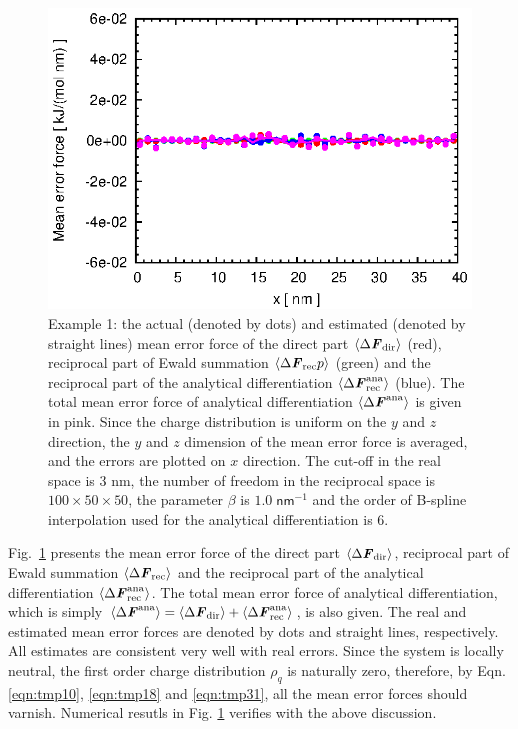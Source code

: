 \documentclass[aps,pre,preprint]{revtex4}
\renewcommand{\v}[1]{\textbf{\textit{#1}}}
\begin{document}
\begin{figure}
  \centering
  \includegraphics[]{fig/error.one_peak.box40x20x20.b1.000.r3.00.n6.K101x051x051/fig.ana.ewald.meanf.eps}
  \caption{Example 1: the actual (denoted by dots) and estimated
    (denoted by straight lines) mean error force of the direct part
    $\langle\Delta \v F_{\textrm{dir}}\rangle$ (red), reciprocal
    part of Ewald summation $\langle\Delta \v F_{\textrm{rec}}p\rangle$ (green) and the reciprocal part of the analytical
    differentiation $\langle\Delta \v
    F^{\textrm{ana}}_{\textrm{rec}}\rangle$ (blue). The total
    mean error force of analytical differentiation $\langle\Delta \v
    F^{\textrm{ana}}\rangle$ is given in pink.  Since the charge
    distribution is uniform on the $y$ and $z$ direction, the $y$ and
    $z$ dimension of the mean error force is averaged, and the errors
    are plotted on $x$ direction.  The cut-off in the real space is 3
    \textsf{nm}, the number of freedom in the reciprocal space is
    $100\times 50\times 50$, the parameter $\beta$ is $1.0\;
    \textsf{nm}^{-1}$ and the order of B-spline interpolation used for
    the analytical differentiation is 6.}
  \label{fig:meanf1}
\end{figure}

Fig.~\ref{fig:meanf1} presents the mean error force of the direct part
$\langle\Delta \v F_{\textrm{dir}}\rangle$, reciprocal part of Ewald
summation $\langle\Delta \v F_{\textrm{rec}}\rangle$ and the
reciprocal part of the analytical differentiation $\langle\Delta \v
F^{\textrm{ana}}_{\textrm{rec}}\rangle$. The total mean error force of
analytical differentiation, which is simply $\langle\Delta \v
F^{\textrm{ana}}\rangle = \langle\Delta \v F_{\textrm{dir}}\rangle +
\langle\Delta \v F^{\textrm{ana}}_{\textrm{rec}}\rangle$, is also
given.  The real and estimated mean error forces are denoted by dots
and straight lines, respectively. All estimates are consistent very
well with real errors.  Since the system is locally neutral, the first
order charge distribution $\rho_q$ is naturally zero, therefore, by
Eqn. \eqref{eqn:tmp10}, \eqref{eqn:tmp18} and \eqref{eqn:tmp31}, all
the mean error forces should varnish. Numerical resutls in
Fig. \ref{fig:meanf1} verifies with the above discussion.
\end{document}
